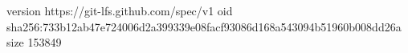 version https://git-lfs.github.com/spec/v1
oid sha256:733b12ab47e724006d2a399339e08facf93086d168a543094b51960b008dd26a
size 153849
